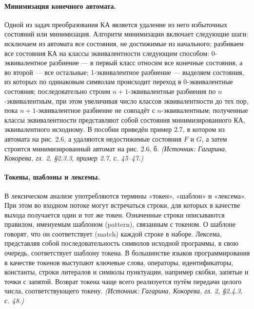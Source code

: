 \documentclass[a4paper,12pt]{article}
\begin{document}
\paragraph{Минимизация конечного автомата.}
Одной из задач преобразования КА является удаление из него избыточных состояний или минимизация. Алгоритм минимизации включает следующие шаги: исключаем из автомата все состояния, не достижимые из начального; разбиваем все состояния КА на классы эквивалентности следующим способом: 0-эквивалентное разбиение — в первый класс относим все конечные состояния, а во второй — все остальные; 1-эквивалентное разбиение — выделяем состояния, из которых по одинаковым символам происходит переход в 0-эквивалентные состояния; последовательно строим \(n+1\)-эквивалентные разбиения по \(n\)-эквивалентным, при этом увеличивая число классов эквивалентности до тех пор, пока \(n+1\)-эквивалентное разбиение не совпадёт с \(n\)-эквивалентным; полученные классы эквивалентности представляют собой состояния минимизированного КА, эквивалентного исходному. В пособии приведён пример 2.7, в котором из автомата на рис. 2.6, а удаляются недостижимые состояния \(F\) и \(G\), а затем строится минимизированный автомат на рис. 2.6, б.
\textit{(Источник: Гагарина, Кокорева, гл. 2, §2.3.3, пример 2.7, с. 45--47.)}

\paragraph{Токены, шаблоны и лексемы.}
В лексическом анализе употребляются термины «токен», «шаблон» и «лексема». При этом во входном потоке могут встречаться строки, для которых в качестве выхода получается один и тот же токен. Означенные строки описываются правилом, именуемым шаблоном (pattern), связанным с токеном. О шаблоне говорят, что он соответствует (match) каждой строке в наборе. Лексема, представляя собой последовательность символов исходной программы, в свою очередь, соответствует шаблону токена. В большинстве языков программирования в качестве токенов выступают ключевые слова, операторы, идентификаторы, константы, строки литералов и символы пунктуации, например скобки, запятые и точки с запятой. Возврат токена чаще всего реализуется путём передачи целого числа, соответствующего токену.
\textit{(Источник: Гагарина, Кокорева, гл. 2, §2.4.3, с. 48.)}
\end{document}
